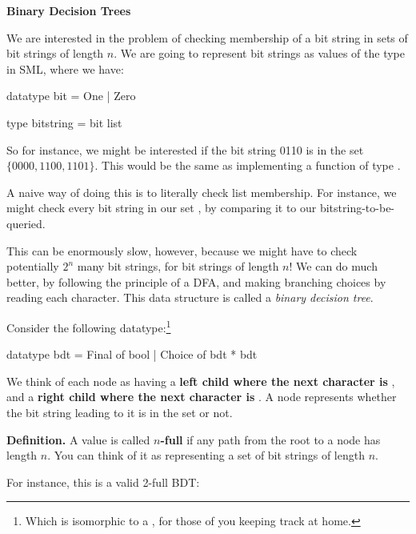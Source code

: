 
\textbf{Binary Decision Trees}

We are interested in the problem of checking membership of a bit string in sets
of bit strings of length $n$. We are going to represent bit strings as values of
the type  in SML, where we have:

\begin{codeblock}
  datatype bit = One | Zero

  type bitstring = bit list
\end{codeblock}

So for instance, we might be interested if the bit string 0110 is in the set $\{
0000, 1100, 1101 \}$. This would be the same as implementing a function of type
.

A naive way of doing this is to literally check list membership. For instance,
we might check every bit string in our set
, by comparing it to our bitstring-to-be-queried.

This can be enormously slow, however, because we might have to check potentially
$2^n$ many bit strings, for bit strings of length $n$! We can do much
better, by following the principle of a DFA, and making branching choices
by reading each character. This data structure is called a \textit{binary decision tree}.

Consider the following datatype:\footnote{Which is isomorphic to a , for
those of you keeping track at home.}
\begin{codeblock}
  datatype bdt =
      Final of bool
    | Choice of bdt * bdt
\end{codeblock}

We think of each  node as having a \textbf{left child where the next character
is }, and a \textbf{right child where the next character is }. A
 node represents whether the bit string leading to it is
in the set or not.

\textbf{Definition.} A value  is called \textbf{$n$-full} if
any path from the root to a  node has length $n$. You can think of
it as representing a set of bit strings of length $n$.

For instance, this is a valid 2-full BDT:

\begin{center}
\end{center}

